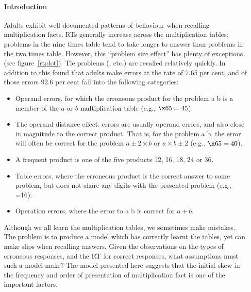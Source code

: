 \paragraph{Introduction} Adults
exhibit well documented patterns of behaviour when recalling
multiplication facts. RTs generally increase across the multiplication
tables: problems in the nine times table tend to take longer to answer than
problems in the two times table. However, this ``problem size effect'' has
plenty of exceptions (see figure~\ref{rtplot}). Tie problems (, 
etc.) are recalled relatively quickly. In addition to this
 found that adults make errors at the rate of 7.65 per cent,
and of those errors 92.6 per cent fall into the following categories:
\begin{itemize}
\item Operand errors, for which the erroneous product for the problem \x a
b is a member of the $a$ or $b$ multiplication table (e.g., $\x65=45$).
\item The operand distance effect: errors are usually operand errors, and
also close in magnitude to the correct product. That is, for the problem \x
a b, the error will often be correct for the problem $a\pm2\times b$ or
$a\times b\pm2$ (e.g., $\x65=40$).
\item A frequent product is one of the five products 12, 16, 18, 24 or 36.
\item Table errors, where the erroneous product is the correct answer to
some problem, but does not share any digits with the presented
problem (e.g., =16).
\item Operation errors, where the error to \x a b is correct for $a+b$.
\end{itemize}

\begin{figure}[bht]\centerline{} \end{figure}

Although we all learn
the multiplication tables, we sometimes make mistakes.
The problem is to produce a model which has correctly learnt the
tables, yet can make slips when recalling answers. Given the
observations on the types of erroneous responses, and the RT for correct
responses, what assumptions must such a model make?
The model presented here suggests that the initial skew in the frequency
and order of presentation of multiplication fact is
one of the important factors.

